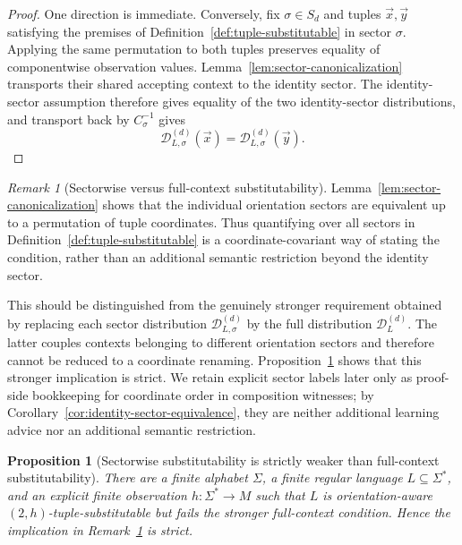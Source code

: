 \documentclass[11pt,a4paper]{article}
\numberwithin{equation}{section}
\theoremstyle{plain}
\newtheorem{proposition}[theorem]{Proposition}
\theoremstyle{definition}
\theoremstyle{remark}
\newtheorem{remark}[theorem]{Remark}
\newcommand{\D}{\mathcal{D}}
\newcommand{\tuple}[1]{\vec{#1}}
\begin{document}
\begin{proof}
One direction is immediate.  Conversely, fix \(\sigma\in S_d\) and tuples
\(\tuple x,\tuple y\) satisfying the premises of
Definition~\ref{def:tuple-substitutable} in sector \(\sigma\).  Applying the
same permutation to both tuples preserves equality of componentwise
observation values.  Lemma~\ref{lem:sector-canonicalization} transports their
shared accepting context to the identity sector.  The identity-sector
assumption therefore gives equality of the two identity-sector distributions,
and transport back by \(C_\sigma^{-1}\) gives
\[
  \D_{L,\sigma}^{(d)}(\tuple x)
  =
  \D_{L,\sigma}^{(d)}(\tuple y).
\]
\end{proof}

\begin{remark}[Sectorwise versus full-context substitutability]
\label{rem:full-context-stronger}
Lemma~\ref{lem:sector-canonicalization} shows that the individual orientation
sectors are equivalent up to a permutation of tuple coordinates.  Thus
quantifying over all sectors in Definition~\ref{def:tuple-substitutable} is a
coordinate-covariant way of stating the condition, rather than an additional
semantic restriction beyond the identity sector.

This should be distinguished from the genuinely stronger requirement obtained
by replacing each sector distribution \(\D_{L,\sigma}^{(d)}\) by the full
distribution \(\D_L^{(d)}\).  The latter couples contexts belonging to
different orientation sectors and therefore cannot be reduced to a coordinate
renaming.  Proposition~\ref{prop:orientation-strict} shows that this stronger
implication is strict.  We retain explicit sector labels later only as
proof-side bookkeeping for coordinate order in composition witnesses; by
Corollary~\ref{cor:identity-sector-equivalence}, they are neither additional
learning advice nor an additional semantic restriction.
\end{remark}

\begin{proposition}[Sectorwise substitutability is strictly weaker than full-context substitutability]
\label{prop:orientation-strict}
There are a finite alphabet \(\Sigma\), a finite regular language
\(L\subseteq\Sigma^*\), and an explicit finite observation
\(h:\Sigma^*\to M\) such that \(L\) is orientation-aware
\((2,h)\)-tuple-substitutable but fails the stronger full-context condition.
Hence the implication in Remark~\ref{rem:full-context-stronger} is strict.
\end{proposition}
\end{document}
